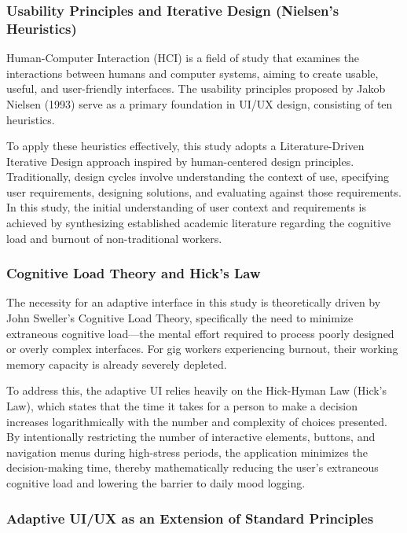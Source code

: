 \subsubsection{Usability Principles and Iterative Design (Nielsen's Heuristics)}

Human-Computer Interaction (HCI) is a field of study that examines the interactions between humans and computer systems, aiming to create usable, useful, and user-friendly interfaces. The usability principles proposed by Jakob Nielsen (1993) serve as a primary foundation in UI/UX design, consisting of ten heuristics.

To apply these heuristics effectively, this study adopts a Literature-Driven Iterative Design approach inspired by human-centered design principles. Traditionally, design cycles involve understanding the context of use, specifying user requirements, designing solutions, and evaluating against those requirements. In this study, the initial understanding of user context and requirements is achieved by synthesizing established academic literature regarding the cognitive load and burnout of non-traditional workers.

\subsubsection{Cognitive Load Theory and Hick's Law}

The necessity for an adaptive interface in this study is theoretically driven by John Sweller's Cognitive Load Theory, specifically the need to minimize extraneous cognitive load—the mental effort required to process poorly designed or overly complex interfaces. For gig workers experiencing burnout, their working memory capacity is already severely depleted.

To address this, the adaptive UI relies heavily on the Hick-Hyman Law (Hick's Law), which states that the time it takes for a person to make a decision increases logarithmically with the number and complexity of choices presented. By intentionally restricting the number of interactive elements, buttons, and navigation menus during high-stress periods, the application minimizes the decision-making time, thereby mathematically reducing the user's extraneous cognitive load and lowering the barrier to daily mood logging.

\subsubsection{Adaptive UI/UX as an Extension of Standard Principles}

